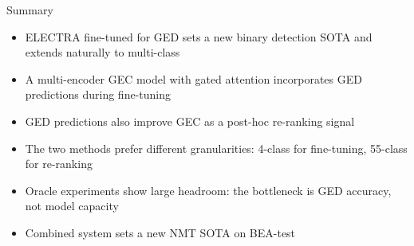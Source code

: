 \documentclass[aspectratio=169]{beamer}
\begin{document}

\begin{frame}{Summary}
  \begin{itemize}
    \item ELECTRA fine-tuned for GED sets a new binary detection SOTA and
      extends naturally to multi-class\\[0.8em]
    \item A multi-encoder GEC model with gated attention incorporates GED
      predictions during fine-tuning\\[0.8em]
    \item GED predictions also improve GEC as a post-hoc re-ranking signal\\[0.8em]
    \item The two methods prefer different granularities: 4-class for
      fine-tuning, 55-class for re-ranking\\[0.8em]
    \item Oracle experiments show large headroom: the bottleneck is GED
      accuracy, not model capacity\\[0.8em]
    \item Combined system sets a new NMT SOTA on BEA-test
  \end{itemize}
\end{frame}
\end{document}
